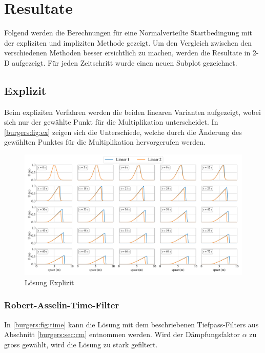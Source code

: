 %
%
\section{Resultate
\label{burgers:section:results}}

	Folgend werden die Berechnungen f\"ur eine Normalverteilte Startbedingung mit der expliziten und impliziten Methode gezeigt.
	Um den Vergleich zwischen den verschiedenen Methoden besser ersichtlich zu machen, werden die Resultate in 2-D aufgezeigt.
	F\"ur jeden Zeitschritt wurde einen neuen Subplot gezeichnet.

	\subsection{Explizit}

	Beim expliziten Verfahren werden die beiden linearen Varianten aufgezeigt,
	wobei sich nur der gew\"ahlte Punkt f\"ur die Multiplikation unterscheidet.
	In \autoref{burgers:fig:ex} zeigen sich die Unterschiede, welche durch die \"Anderung des gewählten Punktes für die Multiplikation hervorgerufen werden.
	

    \begin{figure}
	\centering
	\includegraphics[width=1\textwidth]{papers/burgers/BurgersEquation/lin_paper.pdf}
	\caption{L\"osung Explizit}
	\label{burgers:fig:ex}
	\end{figure}
	
	\subsubsection{Robert-Asselin-Time-Filter}
	In \autoref{burgers:fig:time} kann die L\"osung mit dem beschriebenen Tiefpass-Filters aus Abschnitt \ref{burgers:sec:cm} entnommen werden.
	Wird der D\"ampfungsfaktor $\alpha$ zu gross gew\"ahlt, wird die L\"osung zu stark gefiltert.
	
